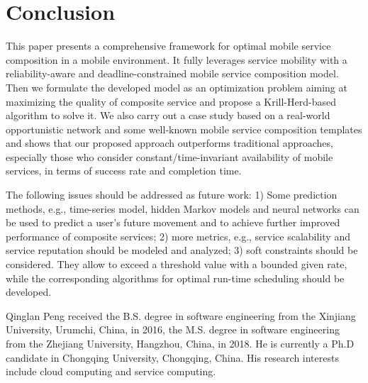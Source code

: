 \documentclass[journal]{IEEEtran}
\begin{document}
\section{Conclusion}
This paper presents a comprehensive framework for optimal mobile service composition in a mobile environment. It fully leverages service mobility with a reliability-aware and deadline-constrained mobile service composition model. Then we formulate the developed model as an optimization problem aiming at maximizing the quality of composite service and propose a Krill-Herd-based algorithm to solve it. We also carry out a case study based on a real-world opportunistic network and some well-known mobile service composition templates and shows that our proposed approach outperforms traditional approaches, especially those who consider constant/time-invariant availability of mobile services, in terms of success rate and completion time.

The following issues should be addressed as future work: 1) Some prediction methods, e.g., time-series model, hidden Markov models and neural networks can be used to predict a user's future movement and to achieve further improved performance of composite services; 2) more metrics, e.g., service scalability and service reputation should be modeled and  analyzed; 3) soft constraints should be considered. They allow to exceed a threshold value with a bounded given rate, while the corresponding algorithms for optimal run-time scheduling should be developed.



\ifCLASSOPTIONcaptionsoff
  \newpage
\fi







\begin{IEEEbiography}{Qinglan Peng}
received the B.S. degree in software engineering from the Xinjiang University, Urumchi, China, in 2016, the M.S. degree in software engineering from the Zhejiang University, Hangzhou, China, in 2018. He is currently a Ph.D candidate in Chongqing University, Chongqing, China. His research interests include cloud computing and service computing.
\end{IEEEbiography}
\end{document}
